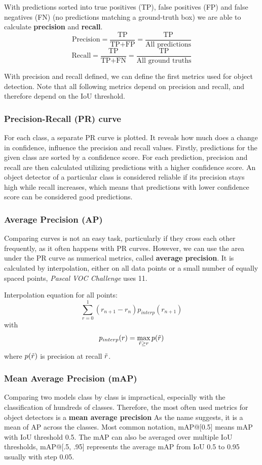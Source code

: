 With predictions sorted into true positives (TP), false positives (FP) and false negatives (FN) (no predictions matching a ground-truth box) we are able to calculate \textbf{precision} and \textbf{recall}.
$$\text{Precision} = \frac{\text{TP}}{\text{TP}+\text{FP}} = \frac{\text{TP}}{\text{All predictions}}$$
$$\text{Recall} = \frac{\text{TP}}{\text{TP}+\text{FN}} = \frac{\text{TP}}{\text{All ground truths}}$$

With precision and recall defined, we can define the first metrics used for object detection. Note that all following metrics depend on precision and recall, and therefore depend on the IoU threshold.

\subsubsection{Precision-Recall (PR) curve}
For each class, a separate PR curve is plotted. It reveals how much does a change in confidence, influence the precision and recall values. Firstly, predictions for the given class are sorted by a confidence score. For each prediction, precision and recall are then calculated utilizing predictions with a higher confidence score. An object detector of a particular class is considered reliable if its precision stays high while recall increases, which means that predictions with lower confidence score can be considered good predictions.

\subsubsection{Average Precision (AP)}
Comparing curves is not an easy task, particularly if they cross each other frequently, as it often happens with PR curves. However, we can use the area under the PR curve as numerical metrics, called \textbf{average precision}. It is calculated by interpolation, either on all data points or a small number of equally spaced points, \textit{Pascal VOC Challenge} uses 11.

Interpolation equation for all points:
$$\sum_{r=0}^1 (r_{n+1} - r_n ) p_{interp}(r_{n+1})$$
with
$$p_{interp}(r) = \max_{\Tilde{r} \geq r} p(\Tilde{r})$$
where $p(\Tilde{r})$ is precision at recall $\Tilde{r}$.

\subsubsection{Mean Average Precision (mAP)}
Comparing two models class by class is impractical, especially with the classification of hundreds of classes. Therefore, the most often used metrics for object detectors is a \textbf{mean average precision} As the name suggests, it is a mean of AP across the classes. Most common notation, mAP@[0.5] means mAP with IoU threshold 0.5. The mAP can also be averaged over multiple IoU thresholds, mAP@[.5, .95] represents the average mAP from IoU 0.5 to 0.95 usually with step 0.05.

